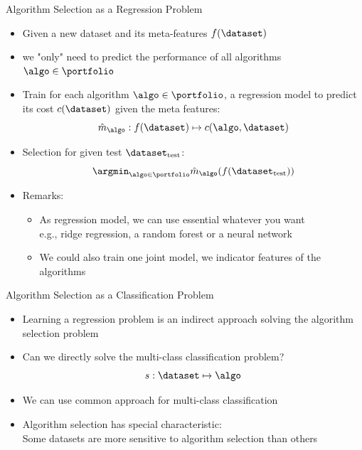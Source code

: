 \begin{frame}[c]{Algorithm Selection as a Regression Problem}

\begin{itemize}
	\item Given a new dataset and its meta-features $f(\dataset)$
	\item we "only" need to predict the performance of all algorithms $\algo \in \portfolio$
	\item Train for each algorithm $\algo \in \portfolio$, a regression model to predict its cost $c(\dataset)$ given the meta features:
	$$\hat{m}_\algo: f(\dataset) \mapsto c(\algo, \dataset) $$
	\pause
	\item Selection for given test $\dataset_{\text{test}}$:
	$$\argmin_{\algo \in \portfolio} \hat{m}_\algo(f(\dataset_{\text{test}}))$$
	\pause
	\item Remarks:
	\begin{itemize}
		\item As regression model, we can use essential whatever you want\\
		e.g., ridge regression, a random forest or a neural network
		\item We could also train one joint model, we indicator features of the algorithms
	\end{itemize}
\end{itemize}


\end{frame}
\begin{frame}[c]{Algorithm Selection as a Classification Problem}

\begin{itemize}
	\item Learning a regression problem is an indirect approach solving the algorithm selection problem
	\pause
	\item Can we directly solve the multi-class classification problem?
	$$s: \dataset \mapsto \algo$$
	\pause
	\item We can use common approach for multi-class classification
	\item Algorithm selection has special characteristic:\\
	\alert{Some datasets are more sensitive to algorithm selection than others}
	
\end{itemize}


\end{frame}
